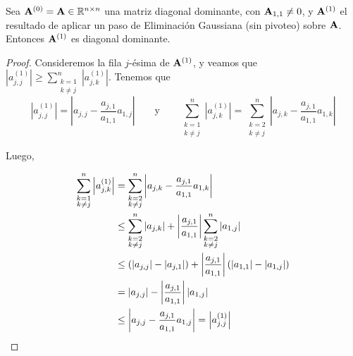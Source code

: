        \begin{lema}
            \label{lema:EG conserva diagonal dominante}
            Sea $\mathbf{A}^{(0)} = \mathbf{A} \in \mathbb{R}^{n \times n}$ una matriz diagonal dominante, con $\mathbf{A}_{1,1} \neq 0$, y $\mathbf{A}^{(1)}$ el resultado de aplicar un paso de Eliminación Gaussiana (sin pivoteo) sobre $\mathbf{A}$. Entonces $\mathbf{A}^{(1)}$ es diagonal dominante.
        \end{lema}
        \begin{proof}
            Consideremos la fila $j$-ésima de $\mathbf{A}^{(1)}$, y veamos que $\left \vert a^{(1)}_{j,j} \right \vert \geq \sum_{\substack{k = 1 \\ k \neq j}}^n \left \vert a^{(1)}_{j,k} \right \vert$. Tenemos que
            \[ \left \vert a^{(1)}_{j,j} \right \vert = \left \vert a_{j,j} - \frac{a_{j,1}}{a_{1,1}} a_{1,j} \right \vert
                \qquad \text{y} \qquad
            \sum_{\substack{k = 1 \\ k \neq j}}^n \left \vert a^{(1)}_{j,k} \right \vert
                = \sum_{\substack{k = 2 \\ k \neq j}}^n \left \vert a_{j,k} - \frac{a_{j,1}}{a_{1,1}} a_{1,k} \right \vert \]

            Luego,

            \[ \begin{split}
                \sum_{\substack{k = 1 \\ k \neq j}}^n \left \vert a^{(1)}_{j,k} \right \vert
                &= \sum_{\substack{k = 2 \\ k \neq j}}^n \left \vert a_{j,k} - \frac{a_{j,1}}{a_{1,1}} a_{1,k} \right \vert \\
                &\leq \sum_{\substack{k = 2 \\ k \neq j}}^n \vert a_{j,k} \vert + \left \vert \frac{a_{j,1}}{a_{1,1}} \right \vert \sum_{\substack{k = 2 \\ k \neq j}}^n \vert a_{1,j} \vert \\
                &\leq \left( \vert a_{j,j} \vert - \vert a_{j,1} \vert \right) + \left \vert \frac{a_{j,1}}{a_{1,1}} \right \vert \left( \vert a_{1,1} \vert - \vert a_{1,j} \vert \right) \\
                &= \vert a_{j,j} \vert - \left \vert \frac{a_{j,1}}{a_{1,1}} \right \vert \vert a_{1,j} \vert \\
                &\leq \left \vert a_{j,j} -  \frac{a_{j,1}}{a_{1,1}} a_{1,j} \right \vert = \left \vert a^{(1)}_{j,j} \right \vert \qedhere
            \end{split} \]
        \end{proof}

